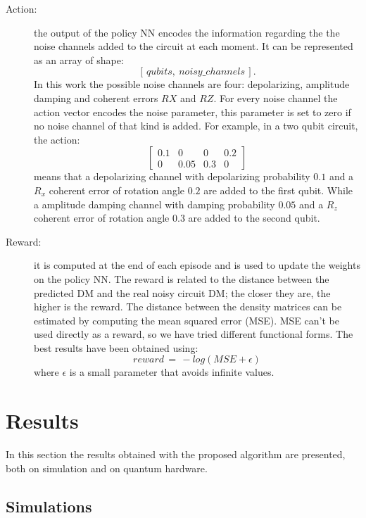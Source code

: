 \documentclass[referee,sn-basic]{sn-jnl} %
\begin{document}
\begin{description}
    \item[Action:] the output of the policy NN encodes the information regarding the the noise channels added to the circuit at each moment. It can be represented as an array of shape:
    $$[\,qubits, \: noisy\_channels\,].$$
    In this work the possible noise channels are four: depolarizing, amplitude damping and coherent errors $RX$ and $RZ$. For every noise channel the action vector encodes the noise parameter, this parameter is set to zero if no noise channel of that kind is added. For example, in a two qubit circuit, the action:
    \begin{equation*}
    \left[\begin{array}{cccc}
    0.1 & 0 & 0 & 0.2 \\
    0 & 0.05 & 0.3 & 0
    \end{array} \right]
    \end{equation*}
    means that a depolarizing channel with depolarizing probability $0.1$ and a $R_x$ coherent error of rotation angle $0.2$ are added to the first qubit. While a amplitude damping channel with damping probability $0.05$ and a $R_z$ coherent error of rotation angle $0.3$ are added to the second qubit.

    \item[Reward:] it is computed at the end of each episode and is used to update the weights on the policy NN. The reward is related to the distance between the predicted DM and the real noisy circuit DM; the closer they are, the higher is the reward. The distance between the density matrices can be estimated by computing the mean squared error (MSE). MSE can't be used directly as a reward, so we have tried different functional forms. The best results have been obtained using:
    $$reward \,= \,-log(MSE+\epsilon)$$
    where $\epsilon$ is a small parameter that avoids infinite values.
\end{description}

\section{Results} \label{sec_results}
In this section the results obtained with the proposed algorithm are presented, both on simulation and on quantum hardware.

\subsection{Simulations} \label{sec_simulation}
\end{document}
